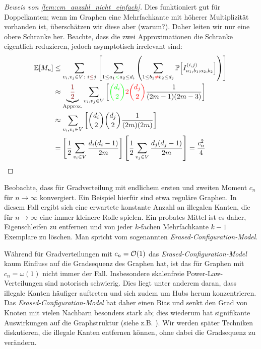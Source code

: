 \begin{proof}[Beweis von \cref{lem:cm_anzahl_nicht_einfach}]
    Dies funktioniert gut für Doppelkanten; wenn im Graphen eine Mehrfachkante mit höherer Multiplizität vorhanden ist, überschätzen wir diese aber (warum?).
    Daher leiten wir nur eine obere Schranke her.
    Beachte, dass die zwei Approximationen die Schranke eigentlich reduzieren, jedoch asymptotisch irrelevant sind:
    \begin{align}
        \expv{M_n}
         & \le \sum_{v_i, v_j \in V\colon i \textcolor{red!50!black}{\le} j} \left[ \sum_{1 \le a_1 \textcolor{green}{<} a_2 \le d_i} \left( \sum_{1 \le b_1 \textcolor{red}{\ne} b_2 \le d_j} \prob{I^{(i,j)}_{a_1,b_1;a_2,b_2}} \right) \right] \\
         & \approx \underbrace{\textcolor{red!50!black}{\frac 1 2}}_\text{Approx.} \sum_{v_i, v_j \in V} \left[ \textcolor{green}{\binom{d_i}{2}} \textcolor{red}{2\binom{d_j}{2}} \frac{1}{(2m - 1)(2m - 3)}   \right]                           \\
         & \approx \sum_{v_i, v_j \in V} \left[ \binom{d_i}{2} \binom{d_j}{2} \frac{1}{(2m)(2m)}   \right]                                                                                                                                        \\
         & = \left[ \frac{1}{2} \sum_{v_i \in V} \frac{d_i (d_i - 1)}{2m}  \right] \left[ \frac{1}{2} \sum_{v_j \in V} \frac{d_j (d_j - 1)}{2m} \right]
        = \frac{c_n^2}{4} \tag*{\qedhere}
    \end{align}
\end{proof}

Beobachte,  dass für Gradverteilung mit endlichem ersten und zweiten Moment $c_n$ für $n \to \infty$ konvergiert.
Ein Beispiel hierfür sind etwa reguläre Graphen.
In diesem Fall ergibt sich eine erwartete konstante Anzahl an illegalen Kanten, die für $n \to \infty$ eine immer kleinere Rolle spielen.
Ein probates Mittel ist es daher, Eigenschleifen zu entfernen und von jeder $k$-fachen Mehrfachkante $k{-}1$ Exemplare zu löschen.
Man spricht vom sogenannten \emph{Erased-Configuration-Model}.

Während für Gradverteilungen mit $c_n = \mathcal{O}\!\left(1\right)$ das \emph{Erased-Configuration-Model} kaum Einfluss auf die Gradsequenz des Graphen hat, ist das für Graphen mit $c_n = \omega(1)$ nicht immer der Fall.
Insbesondere skalenfreie Power-Law-Verteilungen sind notorisch schwierig.
Dies liegt unter anderem daran, dass illegale Kanten häufiger auftreten und sich zudem um Hubs herum konzentrieren.
Das \emph{Erased-Configuration-Model} hat daher einen Bias und senkt den Grad von Knoten mit vielen Nachbarn besonders stark ab;
dies wiederum hat signifikante Auswirkungen auf die Graphstruktur (siehe z.B. \cite{DBLP:journals/snam/SchlauchHZ15}).
Wir werden später Techniken diskutieren, die illegale Kanten entfernen können, ohne dabei die Gradsequenz zu verändern.


